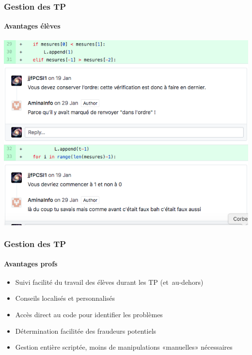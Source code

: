\begin{frame}
	\frametitle{Gestion des TP}
	\framesubtitle{Avantages élèves}

	\begin{center}
		\includegraphics[width=0.8\linewidth]{figures/TP_note_info.png}
	\end{center}

\end{frame}

\begin{frame}
	\frametitle{Gestion des TP}
	\framesubtitle{Avantages profs}

	\begin{itemize}[<+->]
		\item Suivi facilité du travail des élèves durant les TP (et~au-dehors)

		\item Conseils localisés et personnalisés

		\item Accès direct au code pour identifier les problèmes

		\item Détermination facilitée des fraudeurs potentiels

		\item Gestion entière scriptée, moins de manipulations «manuelles» nécessaires

	\end{itemize}

\end{frame}
